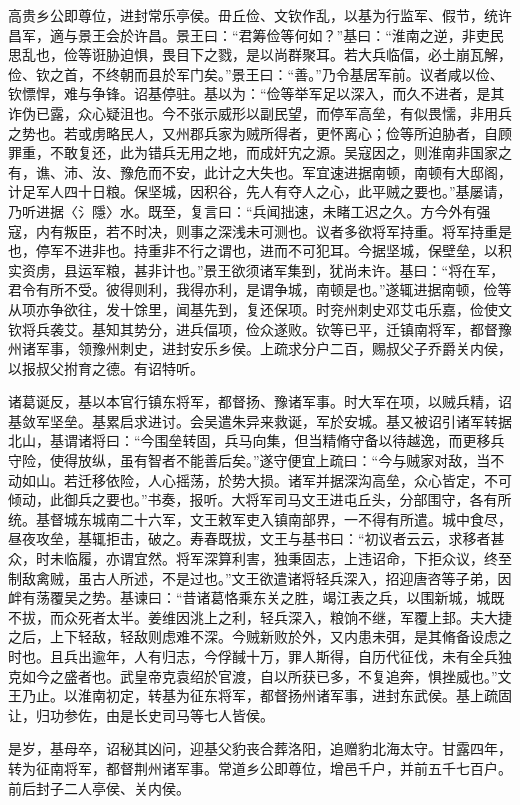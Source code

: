 \documentclass[12pt,UTF8]{ctexbook}
\begin{document}
高贵乡公即尊位，进封常乐亭侯。毌丘俭、文钦作乱，以基为行监军、假节，统许昌军，適与景王会於许昌。景王曰：“君筹俭等何如？”基曰：“淮南之逆，非吏民思乱也，俭等诳胁迫惧，畏目下之戮，是以尚群聚耳。若大兵临偪，必土崩瓦解，俭、钦之首，不终朝而县於军门矣。”景王曰：“善。”乃令基居军前。议者咸以俭、钦慓悍，难与争锋。诏基停驻。基以为：“俭等举军足以深入，而久不进者，是其诈伪已露，众心疑沮也。今不张示威形以副民望，而停军高垒，有似畏懦，非用兵之势也。若或虏略民人，又州郡兵家为贼所得者，更怀离心；俭等所迫胁者，自顾罪重，不敢复还，此为错兵无用之地，而成奸宄之源。吴寇因之，则淮南非国家之有，谯、沛、汝、豫危而不安，此计之大失也。军宜速进据南顿，南顿有大邸阁，计足军人四十日粮。保坚城，因积谷，先人有夺人之心，此平贼之要也。”基屡请，乃听进据〈氵隱〉水。既至，复言曰：“兵闻拙速，未睹工迟之久。方今外有强寇，内有叛臣，若不时决，则事之深浅未可测也。议者多欲将军持重。将军持重是也，停军不进非也。持重非不行之谓也，进而不可犯耳。今据坚城，保壁垒，以积实资虏，县运军粮，甚非计也。”景王欲须诸军集到，犹尚未许。基曰：“将在军，君令有所不受。彼得则利，我得亦利，是谓争城，南顿是也。”遂辄进据南顿，俭等从项亦争欲往，发十馀里，闻基先到，复还保项。时兖州刺史邓艾屯乐嘉，俭使文钦将兵袭艾。基知其势分，进兵偪项，俭众遂败。钦等已平，迁镇南将军，都督豫州诸军事，领豫州刺史，进封安乐乡侯。上疏求分户二百，赐叔父子乔爵关内侯，以报叔父拊育之德。有诏特听。

诸葛诞反，基以本官行镇东将军，都督扬、豫诸军事。时大军在项，以贼兵精，诏基敛军坚垒。基累启求进讨。会吴遣朱异来救诞，军於安城。基又被诏引诸军转据北山，基谓诸将曰：“今围垒转固，兵马向集，但当精脩守备以待越逸，而更移兵守险，使得放纵，虽有智者不能善后矣。”遂守便宜上疏曰：“今与贼家对敌，当不动如山。若迁移依险，人心摇荡，於势大损。诸军并据深沟高垒，众心皆定，不可倾动，此御兵之要也。”书奏，报听。大将军司马文王进屯丘头，分部围守，各有所统。基督城东城南二十六军，文王敕军吏入镇南部界，一不得有所遣。城中食尽，昼夜攻垒，基辄拒击，破之。寿春既拔，文王与基书曰：“初议者云云，求移者甚众，时未临履，亦谓宜然。将军深算利害，独秉固志，上违诏命，下拒众议，终至制敌禽贼，虽古人所述，不是过也。”文王欲遣诸将轻兵深入，招迎唐咨等子弟，因衅有荡覆吴之势。基谏曰：“昔诸葛恪乘东关之胜，竭江表之兵，以围新城，城既不拔，而众死者太半。姜维因洮上之利，轻兵深入，粮饷不继，军覆上邽。夫大捷之后，上下轻敌，轻敌则虑难不深。今贼新败於外，又内患未弭，是其脩备设虑之时也。且兵出逾年，人有归志，今俘馘十万，罪人斯得，自历代征伐，未有全兵独克如今之盛者也。武皇帝克袁绍於官渡，自以所获已多，不复追奔，惧挫威也。”文王乃止。以淮南初定，转基为征东将军，都督扬州诸军事，进封东武侯。基上疏固让，归功参佐，由是长史司马等七人皆侯。

是岁，基母卒，诏秘其凶问，迎基父豹丧合葬洛阳，追赠豹北海太守。甘露四年，转为征南将军，都督荆州诸军事。常道乡公即尊位，增邑千户，并前五千七百户。前后封子二人亭侯、关内侯。
\end{document}
